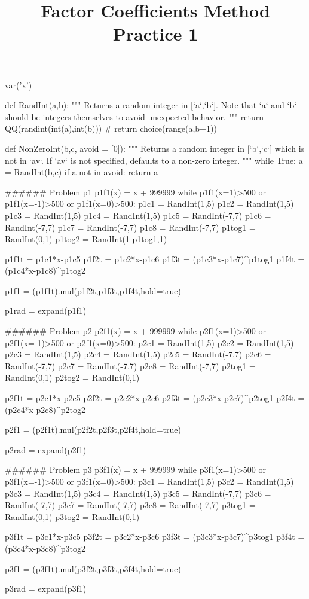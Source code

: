 \documentclass{ximera}
\title{Factor Coefficients Method Practice 1}
\begin{document}
\begin{sagesilent}
var('x')

def RandInt(a,b):
    """ Returns a random integer in [`a`,`b`]. Note that `a` and `b` should be integers themselves to avoid unexpected behavior.
    """
    return QQ(randint(int(a),int(b)))
    # return choice(range(a,b+1))

def NonZeroInt(b,c, avoid = [0]):
    """ Returns a random integer in [`b`,`c`] which is not in `av`. 
        If `av` is not specified, defaults to a non-zero integer.
    """
    while True:
        a = RandInt(b,c)
        if a not in avoid:
            return a

###### Problem p1
p1f1(x) = x + 999999
while p1f1(x=1)>500 or p1f1(x=-1)>500 or p1f1(x=0)>500:
    p1c1 = RandInt(1,5)
    p1c2 = RandInt(1,5)
    p1c3 = RandInt(1,5)
    p1c4 = RandInt(1,5)
    p1c5 = RandInt(-7,7)
    p1c6 = RandInt(-7,7)
    p1c7 = RandInt(-7,7)
    p1c8 = RandInt(-7,7)
    p1tog1 = RandInt(0,1)
    p1tog2 = RandInt(1-p1tog1,1)
    
    p1f1t = p1c1*x-p1c5
    p1f2t = p1c2*x-p1c6
    p1f3t = (p1c3*x-p1c7)^p1tog1
    p1f4t = (p1c4*x-p1c8)^p1tog2
    
    
    p1f1 = (p1f1t).mul(p1f2t,p1f3t,p1f4t,hold=true)

p1rad = expand(p1f1)


###### Problem p2
p2f1(x) = x + 999999
while p2f1(x=1)>500 or p2f1(x=-1)>500 or p2f1(x=0)>500:
    p2c1 = RandInt(1,5)
    p2c2 = RandInt(1,5)
    p2c3 = RandInt(1,5)
    p2c4 = RandInt(1,5)
    p2c5 = RandInt(-7,7)
    p2c6 = RandInt(-7,7)
    p2c7 = RandInt(-7,7)
    p2c8 = RandInt(-7,7)
    p2tog1 = RandInt(0,1)
    p2tog2 = RandInt(0,1)
    
    p2f1t = p2c1*x-p2c5
    p2f2t = p2c2*x-p2c6
    p2f3t = (p2c3*x-p2c7)^p2tog1
    p2f4t = (p2c4*x-p2c8)^p2tog2
    
    
    p2f1 = (p2f1t).mul(p2f2t,p2f3t,p2f4t,hold=true)

p2rad = expand(p2f1)


###### Problem p3
p3f1(x) = x + 999999
while p3f1(x=1)>500 or p3f1(x=-1)>500 or p3f1(x=0)>500:
    p3c1 = RandInt(1,5)
    p3c2 = RandInt(1,5)
    p3c3 = RandInt(1,5)
    p3c4 = RandInt(1,5)
    p3c5 = RandInt(-7,7)
    p3c6 = RandInt(-7,7)
    p3c7 = RandInt(-7,7)
    p3c8 = RandInt(-7,7)
    p3tog1 = RandInt(0,1)
    p3tog2 = RandInt(0,1)
    
    p3f1t = p3c1*x-p3c5
    p3f2t = p3c2*x-p3c6
    p3f3t = (p3c3*x-p3c7)^p3tog1
    p3f4t = (p3c4*x-p3c8)^p3tog2
    
    
    p3f1 = (p3f1t).mul(p3f2t,p3f3t,p3f4t,hold=true)

p3rad = expand(p3f1)




\end{sagesilent}
\end{document}
